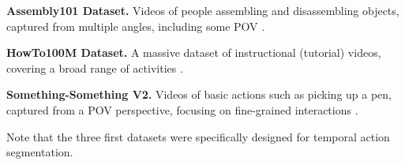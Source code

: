 \noindent\textbf{Assembly101 Dataset.} Videos of people assembling and disassembling objects, captured from multiple angles, including some POV \cite{assembly101-dataset}.

\noindent\textbf{HowTo100M Dataset.} A massive dataset of instructional (tutorial) videos, covering a broad range of activities \cite{howto100m-dataset}.

\noindent\textbf{Something-Something V2.} Videos of basic actions such as picking up a pen, captured from a POV perspective, focusing on fine-grained interactions \cite{something-something-dataset}.

Note that the three first datasets were specifically designed for temporal action segmentation.

